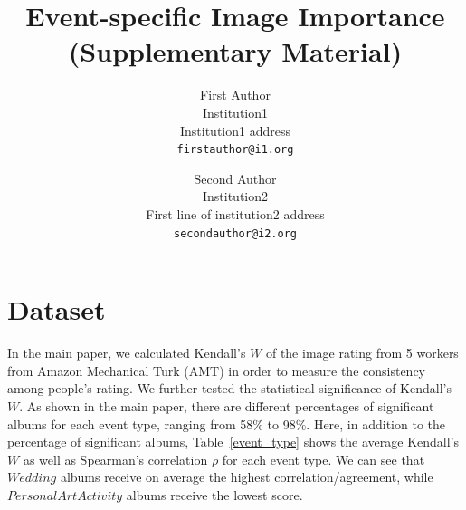 \documentclass[10pt,twocolumn,letterpaper]{article}
\begin{document}
\title{Event-specific Image Importance\\(Supplementary Material)}



\author{First Author\\
Institution1\\
Institution1 address\\
{\tt\small firstauthor@i1.org}
\and
Second Author\\
Institution2\\
First line of institution2 address\\
{\tt\small secondauthor@i2.org}
}

\maketitle

\section{Dataset}
In the main paper, we calculated Kendall's $W$ of the image rating from 5 workers from Amazon Mechanical Turk (AMT) in order to measure the consistency among people's rating. We further tested the statistical significance of Kendall's $W$. As shown in the main paper, there are different percentages of significant albums for each event type, ranging from 58\% to 98\%. Here, in addition to the percentage of significant albums, Table~\ref{event_type} shows the average Kendall's $W$ as well as Spearman's correlation $\rho$ for each event type. We can see that $Wedding$ albums receive on average the highest correlation/agreement, while $Personal Art Activity$ albums receive the lowest score.
\end{document}
